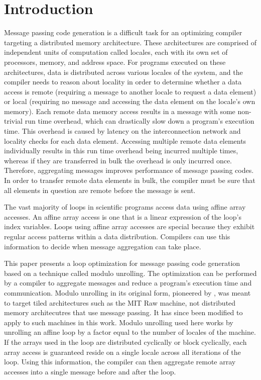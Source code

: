 \section{Introduction}\label{sec:intro} 

Message passing code generation is a difficult task for an optimizing compiler targeting a distributed memory architecture. These architectures are comprised of independent units of computation called locales, each with its own set of processors, memory, and address space. For programs executed on these architectures, data is distributed across various locales of the system, and the compiler needs to reason about locality in order to determine whether a data access is remote (requiring a message to another locale to request a data element) or local (requiring no message and accessing the data element on the locale's own memory). Each remote data memory access results in a message with some non-trivial run time overhead, which can drastically slow down a program's execution time. This overhead is caused by latency on the interconnection network and locality checks for each data element. Accessing multiple remote data elements individually results in this run time overhead being incurred multiple times, whereas if they are transferred in bulk the overhead is only incurred once. Therefore, aggregating messages improves performance of message passing codes. In order to transfer remote data elements in bulk, the compiler must be sure that all elements in question are remote before the message is sent.  

The vast majority of loops in scientific programs access data using affine array accesses. An affine array access is one that is a linear expression of the loop's index variables. Loops using affine array accesses are special because they exhibit regular access patterns within a data distribution. Compilers can use this information to decide when message aggregation can take place. 

This paper presents a loop optimization for message passing code generation based on a technique called modulo unrolling. The optimization can be performed by a compiler to aggregate messages and reduce a program's execution time and communication. Modulo unrolling in its original form, pioneered by \cite{barua1999maps}, was meant to target tiled architectures such as the MIT Raw machine, not distributed memory architecutres that use message passing. It has since been modified to apply to such machines in this work. Modulo unrolling used here works by unrolling an affine loop by a factor equal to the number of locales of the machine. If the arrays used in the loop are distributed cyclically or block cyclically, each array access is guaranteed reside on a single locale across all iterations of the loop. Using this information, the compiler can then aggregate remote array accesses into a single message before and after the loop. 

